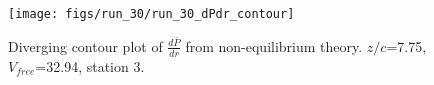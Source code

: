 \begin{figure}[H]
\centering
\texttt{[image: figs/run\_30/run\_30\_dPdr\_contour]}
\caption{Diverging contour plot of $\frac{d\bar{P}}{dr}$ from non-equilibrium theory. $z/c$=7.75, $V_{free}$=32.94, station 3.}
\label{fig:run_30_dPdr_contour}
\end{figure}


